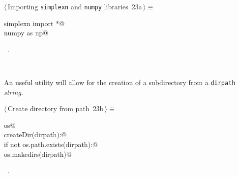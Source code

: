 \documentclass[11pt,oneside]{article}	%
\begin{document}
\begin{flushleft} \small
\begin{minipage}{\linewidth} \label{scrap39}
\protect{}$\langle\,$Importing \texttt{simplexn} and \texttt{numpy} libraries\nobreak\ {\footnotesize 23a}$\,\rangle\equiv$
\vspace{-1ex}
\begin{list}{}{} \item
\mbox{}\verb@from simplexn import *@\\
\mbox{}\verb@import numpy as np@\\
\mbox{}\verb@@{\NWsep}
\end{list}
\vspace{-1ex}
\footnotesize\addtolength{\baselineskip}{-1ex}
\begin{list}{}{\setlength{\itemsep}{-\parsep}\setlength{\itemindent}{-\leftmargin}}
\item \NWtxtMacroRefIn\ .
\end{list}
\end{minipage}\\[4ex]
\end{flushleft}

An useful utility will allow for the creation of a subdirectory from a \texttt{dirpath} \emph{string}.
\begin{flushleft} \small
\begin{minipage}{\linewidth} \label{scrap40}
\protect{}$\langle\,$Create directory from path\nobreak\ {\footnotesize 23b}$\,\rangle\equiv$
\vspace{-1ex}
\begin{list}{}{} \item
\mbox{}\verb@import os@\\
\mbox{}\verb@def createDir(dirpath):@\\
\mbox{}\verb@    if not os.path.exists(dirpath):@\\
\mbox{}\verb@        os.makedirs(dirpath)@\\
\mbox{}\verb@@{\NWsep}
\end{list}
\vspace{-1ex}
\footnotesize\addtolength{\baselineskip}{-1ex}
\begin{list}{}{\setlength{\itemsep}{-\parsep}\setlength{\itemindent}{-\leftmargin}}
\item \NWtxtMacroRefIn\ .
\end{list}
\end{minipage}\\[4ex]
\end{flushleft}
\end{document}
